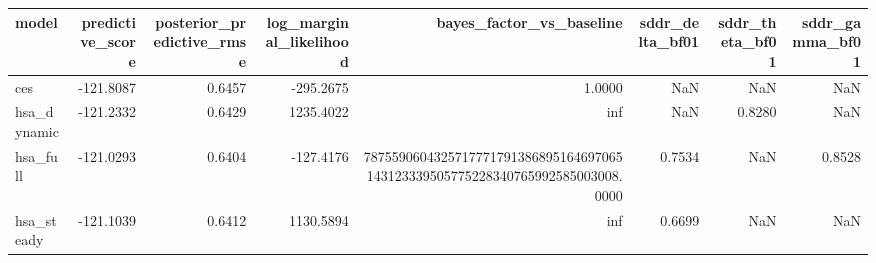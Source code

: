 \begin{tabular}{lrrrrrrr}
\toprule
model & predictive\_score & posterior\_predictive\_rmse & log\_marginal\_likelihood & bayes\_factor\_vs\_baseline & sddr\_delta\_bf01 & sddr\_theta\_bf01 & sddr\_gamma\_bf01 \\
\midrule
ces & -121.8087 & 0.6457 & -295.2675 & 1.0000 & NaN & NaN & NaN \\
hsa\_dynamic & -121.2332 & 0.6429 & 1235.4022 & inf & NaN & 0.8280 & NaN \\
hsa\_full & -121.0293 & 0.6404 & -127.4176 & 7875590604325717771791386895164697065143123339505775228340765992585003008.0000 & 0.7534 & NaN & 0.8528 \\
hsa\_steady & -121.1039 & 0.6412 & 1130.5894 & inf & 0.6699 & NaN & NaN \\
\bottomrule
\end{tabular}
